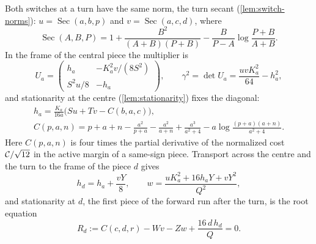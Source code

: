 Both switches at a turn have the same norm, the turn secant (\cref{lem:switch-norms}):
$u=\operatorname{Sec}(a,b,p)$ and $v=\operatorname{Sec}(a,c,d)$, where
\[
\operatorname{Sec}(A,B,P)=1+\frac{B^2}{(A+B)(P+B)}-\frac{B}{P-A}\log\frac{P+B}{A+B}.
\]
In the frame of the central piece the multiplier is
\begin{equation}\label{eq:m2-Ua}
U_a=\begin{pmatrix}h_a&-K_a^2v/(8S^2)\\ S^2u/8&-h_a\end{pmatrix},\qquad
\gamma^2=\det U_a=\frac{uvK_a^2}{64}-h_a^2,
\end{equation}
and stationarity at the centre (\cref{lem:stationarity}) fixes the diagonal:
\begin{equation}\label{eq:m2-ha}
\begin{gathered}
h_a=\frac{K_a}{16a}\bigl(Su+Tv-C(b,a,c)\bigr),\\
C(p,a,n)=p+a+n-\frac{a^2}{p+a}-\frac{a^2}{a+n}+\frac{a^3}{a^2+4}
-a\log\frac{(p+a)(a+n)}{a^2+4}.
\end{gathered}
\end{equation}
Here $C(p,a,n)$ is four times the partial derivative of the normalized cost $\mathcal{C}/\sqrt{12}$ in
the active margin of a same-sign piece. Transport across the centre and the turn to the frame of
the piece $d$ gives
\begin{equation}\label{eq:m2-transport}
h_d=h_a+\frac{vY}{8},\qquad w=\frac{uK_a^2+16h_aY+vY^2}{Q^2},
\end{equation}
and stationarity at $d$, the first piece of the forward run after the turn, is the root equation
\begin{equation}\label{eq:m2-root}
R_d:=C(c,d,r)-Wv-Zw+\frac{16\,d\,h_d}{Q}=0.
\end{equation}

